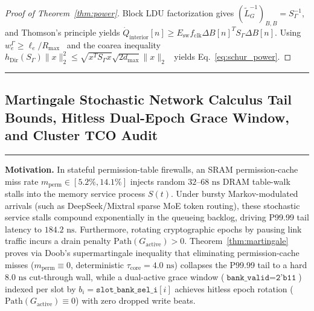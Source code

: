 \documentclass[10pt,twocolumn]{article}
\makeatletter
\newif\ifspecintwocol \specintwocolfalse
\newif\ifspecresume   \specresumefalse
\newcommand{\StartTwoCol}{%
  \if@twocolumn
    \let\spec@next\@empty
  \else
    \ifspecintwocol
      \let\spec@next\@empty
    \else
      \global\specintwocoltrue
      \def\spec@next{\begin{multicols}{2}}%
    \fi
  \fi
  \spec@next
}
\newcommand{\StopTwoCol}{%
  \if@twocolumn
    \onecolumn
    \global\specintwocolfalse
    \let\spec@next\@empty
  \else
    \ifspecintwocol
      \global\specintwocolfalse
      \def\spec@next{\end{multicols}}%
    \else
      \let\spec@next\@empty
    \fi
  \fi
  \spec@next
}
\newcommand{\BeginConnesPlate}{%
  \if@twocolumn
    \onecolumn
    \global\specresumetrue
    \let\spec@platepre\@empty
  \else
    \ifspecintwocol
      \global\specresumetrue
      \let\spec@platepre\StopTwoCol
    \else
      \global\specresumefalse
      \let\spec@platepre\@empty
    \fi
  \fi
  \spec@platepre
  \par\vspace{4pt}\noindent\textcolor{black!25}{\rule{\textwidth}{0.4pt}}\par\vspace{3pt}%
}
\newcommand{\EndConnesPlate}{%
  \par\vspace{3pt}\noindent\textcolor{black!25}{\rule{\textwidth}{0.4pt}}\par\vspace{4pt}%
  \ifspecresume
    \global\specresumefalse
    \let\spec@platepost\StartTwoCol
  \else
    \let\spec@platepost\@empty
  \fi
  \spec@platepost
}
\theoremstyle{spectralthm}
\makeatother
\begin{document}
\begin{proof}[Proof of Theorem~\ref{thm:power}]
Block LDU factorization gives $(\tilde{L}_G^{-1})_{B,B} = S_\Gamma^{-1}$, and Thomson's principle yields $\dot{Q}_{\mathrm{interior}}[n] \ge E_{\mathrm{sw}} f_{\mathrm{clk}} \Delta B[n]^T S_\Gamma \Delta B[n]$. Using $w_e^\Gamma \ge \ell_e / R_{\max}$~\cite{spielman2011graph} and the coarea inequality $h_{\mathrm{Dir}}(S_\Gamma)\|x\|_2^2 \le \sqrt{x^T S_\Gamma x}\sqrt{2d_{\max}}\|x\|_2$~\cite{kamal2026cheeger} yields Eq.~\eqref{eq:schur_power}.
\end{proof}
\EndConnesPlate

\subsection{Martingale Stochastic Network Calculus Tail Bounds, Hitless Dual-Epoch Grace Window, and Cluster TCO Audit}
\label{sec:tco}

\BeginConnesPlate
\noindent\textbf{Motivation.}\; In stateful permission-table firewalls, an SRAM permission-cache miss rate $m_{\mathrm{perm}} \in [5.2\%, 14.1\%]$ injects random $32$--$68\text{~ns}$ DRAM table-walk stalls into the memory service process $S(t)$. Under bursty Markov-modulated arrivals (such as DeepSeek/Mixtral sparse MoE token routing), these stochastic service stalls compound exponentially in the queueing backlog, driving P99.99 tail latency to $184.2\text{~ns}$. Furthermore, rotating cryptographic epochs by pausing link traffic incurs a drain penalty $\mathrm{Path}(G_{\mathrm{active}}) > 0$. Theorem~\ref{thm:martingale} proves via Doob's supermartingale inequality that eliminating permission-cache misses ($m_{\mathrm{perm}} \equiv 0$, deterministic $\tau_{\mathrm{core}} = 4.0\text{~ns}$) collapses the P99.99 tail to a hard $8.0\text{~ns}$ cut-through wall, while a dual-active grace window ($\texttt{bank\_valid} = \texttt{2'b11}$) indexed per slot by $b_i = \texttt{slot\_bank\_sel\_i}[i]$ achieves hitless epoch rotation ($\mathrm{Path}(G_{\mathrm{active}}) \equiv 0$) with zero dropped write beats.
\end{document}

